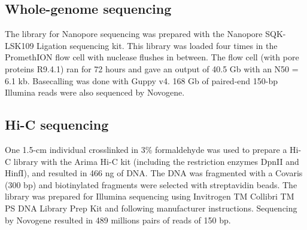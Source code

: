 \subsection{Whole-genome sequencing}

The library for Nanopore sequencing was prepared with the Nanopore SQK-LSK109 Ligation sequencing kit. This library was loaded four times in the PromethION flow cell with nuclease flushes in between. The flow cell (with pore proteins R9.4.1) ran for 72 hours and gave an output of 40.5 Gb with an N50 = 6.1 kb. Basecalling was done with Guppy v4. 168 Gb of paired-end 150-bp Illumina reads were also sequenced by Novogene.




\subsection{Hi-C sequencing}

One 1.5-cm individual crosslinked in 3\% formaldehyde was used to prepare a Hi-C library with the Arima Hi-C kit (including the restriction enzymes DpnII and HinfI), and resulted in 466 ng of DNA. The DNA was fragmented with a Covaris (300 bp) and biotinylated fragments were selected with streptavidin beads. The library was prepared for Illumina sequencing using Invitrogen TM Collibri TM PS DNA Library Prep Kit and following manufacturer instructions. Sequencing by Novogene resulted in 489 millions pairs of reads of 150 bp.

